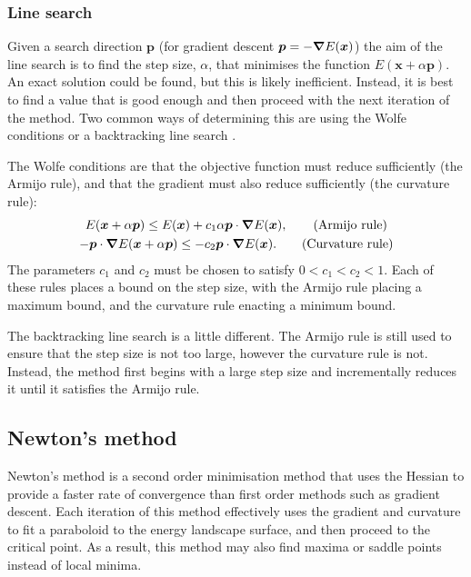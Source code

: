 \subsubsection{Line search}
Given a search direction $\bm{p}$ (for gradient descent $\bm{p} =-\bm{\nabla} E(\bm{x})$) the aim of the line search is to find the step size, $\alpha$, that minimises the function $E(\bm{x}+\alpha\bm{p})$.
An exact solution could be found, but this is likely inefficient.
Instead, it is best to find a value that is good enough and then proceed with the next iteration of the method.
Two common ways of determining this are using the Wolfe conditions \cite{Wolfe1969,Wolfe1971} or a backtracking line search \cite{Armijo1966}.

The Wolfe conditions are that the objective function must reduce sufficiently (the Armijo rule), and that the gradient must also reduce sufficiently (the curvature rule):
\begin{gather}
  E(\bm{x}+\alpha\bm{p}) \le E(\bm{x}) + c_1 \alpha \bm{p} \cdot \bm{\nabla} E(\bm{x}),     \qquad \text{(Armijo rule)}
  \label{eq:lm-ls-armijo}
  \\
  - \bm{p} \cdot \bm{\nabla} E(\bm{x}+\alpha\bm{p}) \le - c_2 \bm{p} \cdot \bm{\nabla} E(\bm{x}). \qquad \text{(Curvature rule)}
  \label{eq:lm-ls-curvature}
\end{gather}
The parameters $c_1$ and $c_2$ must be chosen to satisfy $0 < c_1 < c_2 < 1$.
Each of these rules places a bound on the step size, with the Armijo rule placing a maximum bound, and the curvature rule enacting a minimum bound.

The backtracking line search is a little different.
The Armijo rule is still used to ensure that the step size is not too large, however the curvature rule is not.
Instead, the method first begins with a large step size and incrementally reduces it until it satisfies the Armijo rule.


\subsection{Newton's method}
Newton's method is a second order minimisation method that uses the Hessian to provide a faster rate of convergence than first order methods such as gradient descent.
Each iteration of this method effectively uses the gradient and curvature to fit a paraboloid to the energy landscape surface, and then proceed to the critical point.
As a result, this method may also find maxima or saddle points instead of local minima.

